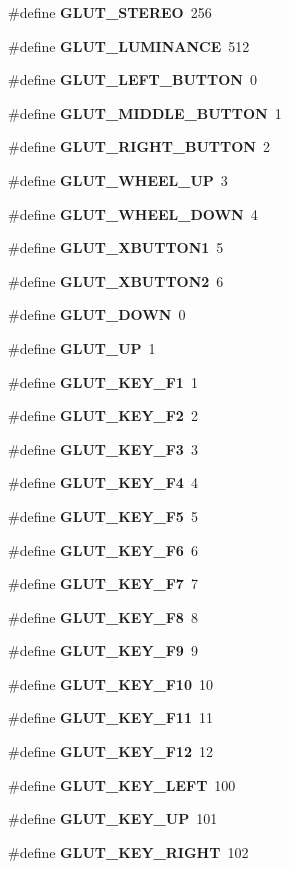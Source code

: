 \begin{DoxyCompactItemize}
\#define {\bf G\+L\+U\+T\+\_\+\+S\+T\+E\+R\+EO}~256
\item 
\#define {\bf G\+L\+U\+T\+\_\+\+L\+U\+M\+I\+N\+A\+N\+CE}~512
\item 
\#define {\bf G\+L\+U\+T\+\_\+\+L\+E\+F\+T\+\_\+\+B\+U\+T\+T\+ON}~0
\item 
\#define {\bf G\+L\+U\+T\+\_\+\+M\+I\+D\+D\+L\+E\+\_\+\+B\+U\+T\+T\+ON}~1
\item 
\#define {\bf G\+L\+U\+T\+\_\+\+R\+I\+G\+H\+T\+\_\+\+B\+U\+T\+T\+ON}~2
\item 
\#define {\bf G\+L\+U\+T\+\_\+\+W\+H\+E\+E\+L\+\_\+\+UP}~3
\item 
\#define {\bf G\+L\+U\+T\+\_\+\+W\+H\+E\+E\+L\+\_\+\+D\+O\+WN}~4
\item 
\#define {\bf G\+L\+U\+T\+\_\+\+X\+B\+U\+T\+T\+O\+N1}~5
\item 
\#define {\bf G\+L\+U\+T\+\_\+\+X\+B\+U\+T\+T\+O\+N2}~6
\item 
\#define {\bf G\+L\+U\+T\+\_\+\+D\+O\+WN}~0
\item 
\#define {\bf G\+L\+U\+T\+\_\+\+UP}~1
\item 
\#define {\bf G\+L\+U\+T\+\_\+\+K\+E\+Y\+\_\+\+F1}~1
\item 
\#define {\bf G\+L\+U\+T\+\_\+\+K\+E\+Y\+\_\+\+F2}~2
\item 
\#define {\bf G\+L\+U\+T\+\_\+\+K\+E\+Y\+\_\+\+F3}~3
\item 
\#define {\bf G\+L\+U\+T\+\_\+\+K\+E\+Y\+\_\+\+F4}~4
\item 
\#define {\bf G\+L\+U\+T\+\_\+\+K\+E\+Y\+\_\+\+F5}~5
\item 
\#define {\bf G\+L\+U\+T\+\_\+\+K\+E\+Y\+\_\+\+F6}~6
\item 
\#define {\bf G\+L\+U\+T\+\_\+\+K\+E\+Y\+\_\+\+F7}~7
\item 
\#define {\bf G\+L\+U\+T\+\_\+\+K\+E\+Y\+\_\+\+F8}~8
\item 
\#define {\bf G\+L\+U\+T\+\_\+\+K\+E\+Y\+\_\+\+F9}~9
\item 
\#define {\bf G\+L\+U\+T\+\_\+\+K\+E\+Y\+\_\+\+F10}~10
\item 
\#define {\bf G\+L\+U\+T\+\_\+\+K\+E\+Y\+\_\+\+F11}~11
\item 
\#define {\bf G\+L\+U\+T\+\_\+\+K\+E\+Y\+\_\+\+F12}~12
\item 
\#define {\bf G\+L\+U\+T\+\_\+\+K\+E\+Y\+\_\+\+L\+E\+FT}~100
\item 
\#define {\bf G\+L\+U\+T\+\_\+\+K\+E\+Y\+\_\+\+UP}~101
\item 
\#define {\bf G\+L\+U\+T\+\_\+\+K\+E\+Y\+\_\+\+R\+I\+G\+HT}~102

\end{DoxyCompactItemize}

